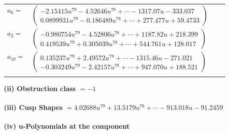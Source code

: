 \documentclass[1p]{elsarticle_modified}
\theoremstyle{definition}
\begin{document}
\begin{tabular}{m{7pt} m{180pt} m{7pt} m{180pt} }
\flushright $a_{6}=$&$\begin{pmatrix}-2.15415 u^{79}-4.52646 u^{78}+\cdots-1317.07 u-333.037\\0.0899931 u^{79}-0.186489 u^{78}+\cdots+277.477 u+59.4733\end{pmatrix}$ \\
\flushright $a_{2}=$&$\begin{pmatrix}-0.980754 u^{79}-4.52806 u^{78}+\cdots+1187.82 u+218.399\\0.419539 u^{79}+0.305039 u^{78}+\cdots+544.761 u+128.017\end{pmatrix}$ \\
\flushright $a_{10}=$&$\begin{pmatrix}0.135237 u^{79}+2.49572 u^{78}+\cdots-1315.46 u-271.021\\-0.303249 u^{79}-2.42157 u^{78}+\cdots+947.070 u+188.521\end{pmatrix}$\\&\end{tabular}
\flushleft \textbf{(ii) Obstruction class $= -1$}\\~\\
\flushleft \textbf{(iii) Cusp Shapes $= 4.02688 u^{79}+13.5179 u^{78}+\cdots-913.018 u-91.2459$}\\~\\
\newpage\renewcommand{\arraystretch}{1}
\flushleft \textbf{(iv) u-Polynomials at the component}\newline \\
\end{document}
